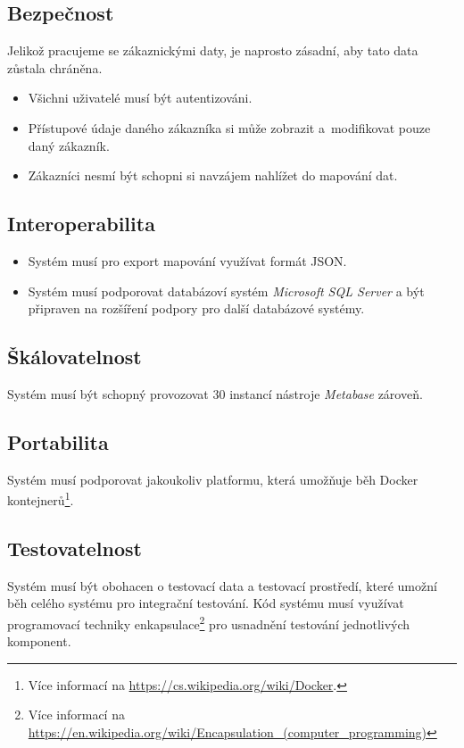\subsection{Bezpečnost}

Jelikož pracujeme se zákaznickými daty, je naprosto zásadní, aby tato data zůstala chráněna.

\begin{itemize}
    \item Všichni uživatelé musí být autentizováni.
    \item Přístupové údaje daného zákazníka si může zobrazit a~modifikovat pouze daný zákazník.
    \item Zákazníci nesmí být schopni si navzájem nahlížet do mapování dat. 
\end{itemize}

\subsection{Interoperabilita}
\begin{itemize}
    \item Systém musí pro export mapování využívat formát JSON.
    \item Systém musí podporovat databázoví systém \textit{Microsoft SQL Server} a být připraven na rozšíření podpory pro další databázové systémy.
\end{itemize}

\subsection{Škálovatelnost}

Systém musí být schopný provozovat 30 instancí nástroje \textit{Metabase} zároveň.

\subsection{Portabilita}

Systém musí podporovat jakoukoliv platformu, která umožňuje běh Docker kontejnerů\footnote{Více informací na \url{https://cs.wikipedia.org/wiki/Docker}.}.

\subsection{Testovatelnost}

Systém musí být obohacen o testovací data a testovací prostředí, které umožní běh celého systému pro integrační testování.
Kód systému musí využívat programovací techniky enkapsulace\footnote{Více informací na \url{https://en.wikipedia.org/wiki/Encapsulation_(computer_programming)}} pro usnadnění testování jednotlivých komponent.